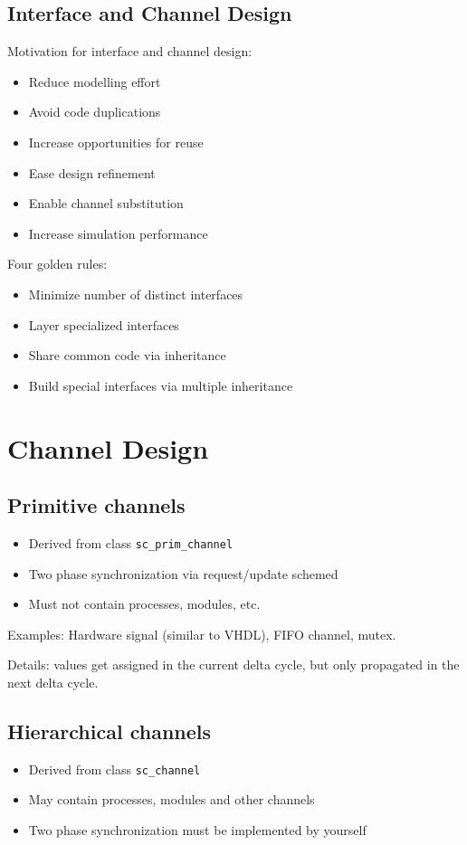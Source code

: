 \subsection{Interface and Channel Design}
Motivation for interface and channel design:
\begin{itemize}
    \item Reduce modelling effort
    \item Avoid code duplications
    \item Increase opportunities for reuse
    \item Ease design refinement
    \item Enable channel substitution
    \item Increase simulation performance
\end{itemize}

Four golden rules:
\begin{itemize}
    \item Minimize number of distinct interfaces
    \item Layer specialized interfaces
    \item Share common code via inheritance
    \item Build special interfaces via multiple inheritance
\end{itemize}

\section{Channel Design}
\subsection{Primitive channels}
\begin{itemize}
    \item Derived from class \lstinline{sc_prim_channel}
    \item Two phase synchronization via request/update schemed
    \item Must not contain processes, modules, etc.
\end{itemize}

Examples: Hardware signal (similar to VHDL), FIFO channel, mutex.

Details: values get assigned in the current delta cycle, but only propagated in the next delta cycle.

\subsection{Hierarchical channels}
\begin{itemize}
    \item Derived from class \lstinline{sc_channel}
    \item May contain processes, modules and other channels
    \item Two phase synchronization must be implemented by yourself
\end{itemize}

